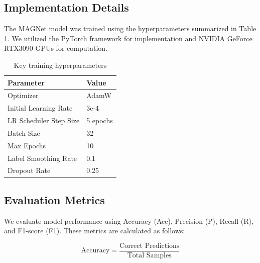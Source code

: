 \documentclass[runningheads]{llncs}
\begin{document}
\subsection{Implementation Details}
\label{subsubsec:training_details}

The MAGNet model was trained using the hyperparameters summarized in Table \ref{tab:training_params}. We utilized the PyTorch framework \cite{cite_pytorch} for implementation and NVIDIA GeForce RTX3090 GPUs for computation.

\begin{table}[htbp]
\caption{Key training hyperparameters}
\label{tab:training_params}
\centering
\begin{tabular}{|l|l|}
\hline
\textbf{Parameter} & \textbf{Value} \\
\hline
Optimizer & AdamW \\ %
Initial Learning Rate & 3e-4 \\ %
LR Scheduler Step Size & 5 epochs \\ %
Batch Size & 32 \\ %
Max Epochs & 10 \\ %
Label Smoothing Rate & 0.1 \\ %
Dropout Rate & 0.25 \\ %
\hline
\end{tabular}
\end{table}









\subsection{Evaluation Metrics}
\label{subsec:eval_metrics} %

We evaluate model performance using Accuracy (Acc), Precision (P), Recall (R), and F1-score (F1). These metrics are calculated as follows:

\begin{equation}
\text{Accuracy} = \frac{\text{Correct Predictions}}{\text{Total Samples}}
\end{equation}
\end{document}
